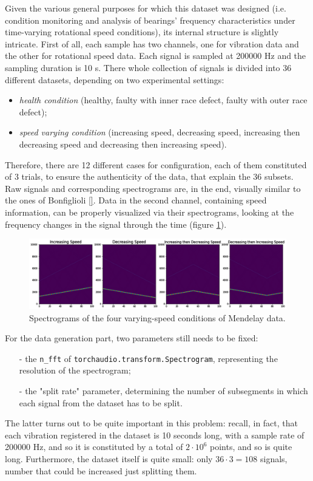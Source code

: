 \documentclass[../main.tex]{subfiles}
\begin{document}
Given the various general purposes for which this dataset was designed (i.e. condition monitoring and analysis of bearings' frequency characteristics under time-varying rotational speed conditions), its internal structure is slightly intricate. First of all, each sample has two channels, one for vibration data and the other for rotational speed data. Each signal is sampled at 200000 Hz and the sampling duration is 10 s. There whole collection of signals is divided into 36 different datasets, depending on two experimental settings:
\begin{itemize}
	\item \textit{health condition} (healthy, faulty with inner race defect, faulty with outer race defect);
	\item \textit{speed varying condition} (increasing speed, decreasing speed, increasing then decreasing speed and decreasing then increasing speed).
\end{itemize} 
Therefore, there are 12 different cases for configuration, each of them constituted of 3 trials, to ensure the authenticity of the data, that explain the 36 subsets. Raw signals and corresponding spectrograms are, in the end, visually similar to the ones of Bonfiglioli \ref{}. Data in the second channel, containing speed information, can be properly visualized via their spectrograms, looking at the frequency changes in the signal through the time (figure \ref{fig:mendelay_speed_changes}).
\begin{figure}[!ht]
	\centering
	\includegraphics[width=\textwidth]{pictures/mendelay_speed_changes}
	\caption{Spectrograms of the four varying-speed conditions of Mendelay data.}
	\label{fig:mendelay_speed_changes}
\end{figure}
For the data generation part, two parameters still needs to be fixed:
\begin{itemize}
	\item[-] the \texttt{n\_fft} of \texttt{torchaudio.transform.Spectrogram}, representing the resolution of the spectrogram;
	\item[-] the "split rate" parameter, determining the number of subsegments in which each signal from the dataset has to be split.
\end{itemize}
The latter turns out to be quite important in this problem: recall, in fact, that each vibration registered in the dataset is 10 seconds long, with a sample rate of 200000 Hz, and so it is constituted by a total of $2\cdot 10^6$ points, and so is quite long. Furthermore, the dataset itself is quite small: only $36\cdot 3 = 108$ signals, number that could be increased just splitting them.
\end{document}

